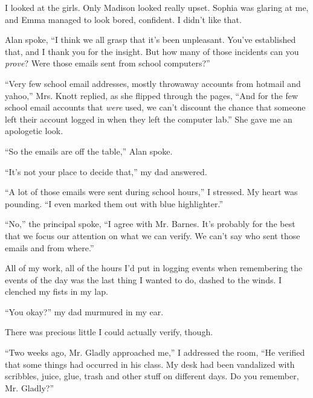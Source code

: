I looked at the girls.  Only Madison looked really upset.  Sophia was glaring at me, and Emma managed to look bored, confident.  I didn't like that.



Alan spoke, ``I think we all grasp that it's been unpleasant.  You've established that, and I thank you for the insight.  But how many of those incidents can you \emph{prove}?  Were those emails sent from school computers?''



``Very few school email addresses, mostly throwaway accounts from hotmail and yahoo,'' Mrs. Knott replied, as she flipped through the pages, ``And for the few school email accounts that \emph{were }used, we can't discount the chance that someone left their account logged in when they left the computer lab.''  She gave me an apologetic look.



``So the emails are off the table,'' Alan spoke.



``It's not your place to decide that,'' my dad answered.



``A lot of those emails were sent during school hours,'' I stressed.  My heart was pounding.  ``I even marked them out with blue highlighter.''



``No,'' the principal spoke, ``I agree with Mr. Barnes.  It's probably for the best that we focus our attention on what we can verify.  We can't say who sent those emails and from where.''



All of my work, all of the hours I'd put in logging events when remembering the events of the day was the last thing I wanted to do, dashed to the winds.  I clenched my fists in my lap.



``You okay?'' my dad murmured in my ear.



There was precious little I could actually verify, though.



``Two weeks ago, Mr. Gladly approached me,'' I addressed the room, ``He verified that some things had occurred in his class.  My desk had been vandalized with scribbles, juice, glue, trash and other stuff on different days.  Do you remember, Mr. Gladly?''



